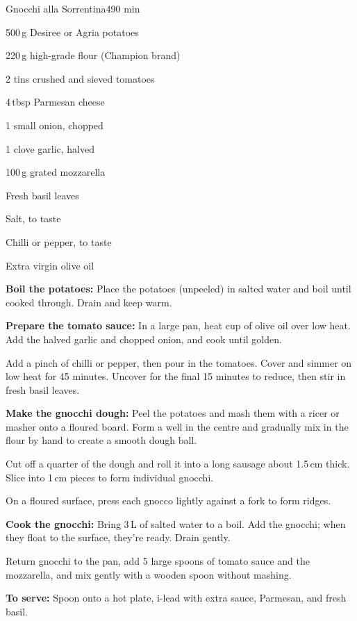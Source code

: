 \begin{recipebox}{Gnocchi alla Sorrentina}{4}{90 min}
  \begin{ingredients}
    \item 500\,g Desiree or Agria potatoes
    \item 220\,g high-grade flour (Champion brand)
    \item 2 tins crushed and sieved tomatoes
    \item 4\,tbsp Parmesan cheese
    \item 1 small onion, chopped
    \item 1 clove garlic, halved
    \item 100\,g grated mozzarella
    \item Fresh basil leaves
    \item Salt, to taste
    \item Chilli or pepper, to taste
    \item Extra virgin olive oil
  \end{ingredients}

  \begin{method}
    \item \textbf{Boil the potatoes:} Place the potatoes (unpeeled) in salted water and boil until cooked through. Drain and keep warm.
    \item \textbf{Prepare the tomato sauce:} In a large pan, heat  cup of olive oil over low heat. Add the halved garlic and chopped onion, and cook until golden.
    \item Add a pinch of chilli or pepper, then pour in the tomatoes. Cover and simmer on low heat for 45 minutes. Uncover for the final 15 minutes to reduce, then stir in fresh basil leaves.
    \item \textbf{Make the gnocchi dough:} Peel the potatoes and mash them with a ricer or masher onto a floured board. Form a well in the centre and gradually mix in the flour by hand to create a smooth dough ball.
    \item Cut off a quarter of the dough and roll it into a long sausage about 1.5\,cm thick. Slice into 1\,cm pieces to form individual gnocchi.
    \item On a floured surface, press each gnocco lightly against a fork to form ridges.
    \item \textbf{Cook the gnocchi:} Bring 3\,L of salted water to a boil. Add the gnocchi; when they float to the surface, they’re ready. Drain gently.
    \item Return gnocchi to the pan, add 5 large spoons of tomato sauce and the mozzarella, and mix gently with a wooden spoon without mashing.
    \item \textbf{To serve:} Spoon onto a hot plate, i-lead  with extra sauce, Parmesan, and fresh basil.
  \end{method}


\end{recipebox}
